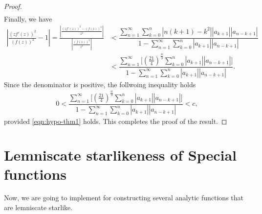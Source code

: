 \documentclass[a4paper,11pt,reqno]{amsart}
\begin{document}
\begin{proof}
\begin{align*}
\end{align*}
Finally, we have 
\begin{align*}
   \left| \frac{(z f'(z))^2}{(f(z))^2} -1\right| =  \frac{\left|\tfrac{( z f'(z) )^2- ( f(z) )^2} {z^2}\right|}{\left|\tfrac{( f(z) )^2} {z^2}\right|} &< \dfrac{\sum_{n=1}^{\infty} \sum_{k=0}^n \left|n(k+1) -k^2\right| |a_{k+1}|  |a_{n-k+1}|}{1- \sum_{n=1}^{\infty} \sum_{k=0}^n |a_{k+1}|  |a_{n-k+1}|}\\&< \dfrac{\sum_{n=1}^{\infty}\bigg[\left(\frac{21}{4}\right)^{\tfrac{n}{3}} \sum_{k=0}^n  |a_{k+1}|  |a_{n-k+1}|\bigg]}{1- \sum_{n=1}^{\infty} \sum_{k=0}^n |a_{k+1}|  |a_{n-k+1}|}.
\end{align*}
Since the denominator is positive, the follwoing inequality holds
\begin{align*}
    0<\dfrac{\sum_{n=1}^{\infty}\bigg[\left(\frac{21}{4}\right)^{\tfrac{n}{3}} \sum_{k=0}^n  |a_{k+1}|  |a_{n-k+1}|\bigg]}{1- \sum_{n=1}^{\infty} \sum_{k=0}^n |a_{k+1}|  |a_{n-k+1}|}< c, 
\end{align*}
provided \eqref{eqn:hypo-thm1} holds. This completes the proof of the result. 
\end{proof}



\section{Lemniscate starlikeness of Special functions}\label{sec:Appl-special}
Now, we are going to implement  for constructing several analytic functions that are lemniscate starlike. 
\end{document}
